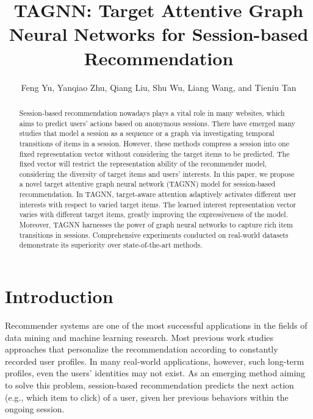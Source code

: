\documentclass[sigconf]{acmart}
\author[F. Yu, Y. Zhu, Q. Liu, S. Wu, L. Wang, T. Tan]{Feng Yu, Yanqiao Zhu, Qiang Liu, Shu Wu, Liang Wang, and Tieniu Tan}
\affiliation{\institution{Center for Research on Intelligent Perception and Computing, Institute of Automation, Chinese Academy of Sciences}
	\institution{School of Artificial Intelligence, University of Chinese Academy of Sciences}
	\institution{RealAI \qquad Tsinghua University}
}
\begin{document}
\title{TAGNN: Target Attentive Graph Neural Networks for Session-based Recommendation}

\begin{abstract}
Session-based recommendation nowadays plays a vital role in many websites, which aims to predict users' actions based on anonymous sessions. There have emerged many studies that model a session as a sequence or a graph via investigating temporal transitions of items in a session. However, these methods compress a session into one fixed representation vector without considering the target items to be predicted. The fixed vector will restrict the representation ability of the recommender model, considering the diversity of target items and users' interests. In this paper, we propose a novel target attentive graph neural network (TAGNN) model for session-based recommendation. In TAGNN, target-aware attention adaptively activates different user interests with respect to varied target items. The learned interest representation vector varies with different target items, greatly improving the expressiveness of the model. Moreover, TAGNN harnesses the power of graph neural networks to capture rich item transitions in sessions. Comprehensive experiments conducted on real-world datasets demonstrate its superiority over state-of-the-art methods.
\end{abstract}


\maketitle

\section{Introduction}

Recommender systems are one of the most successful applications in the fields of data mining and machine learning research.
Most previous work studies approaches that personalize the recommendation according to constantly recorded user profiles. In many real-world applications, however, such long-term profiles, even the users' identities may not exist. As an emerging method aiming to solve this problem, session-based recommendation predicts the next action (e.g., which item to click) of a user, given her previous behaviors within the ongoing session.
\end{document}
